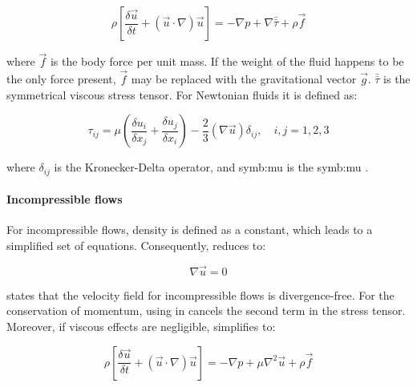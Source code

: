 \begin{equation}
\rho\left[\frac{\delta \vec{u}}{\delta t}+(\vec{u}\cdot\nabla)\vec{u} \right ]=-\nabla p + \nabla \bar{\bar{\tau}}+\rho \vec{f}
\label{eq:theory:momentum_conservation}
\end{equation}

where $\vec{f}$ is the body force per unit mass. If the weight of the fluid happens to be the only force present, $\vec{f}$ may be replaced with the gravitational vector $\vec{g}$.
$\bar{\bar{\tau}}$ is the symmetrical viscous stress tensor. For Newtonian fluids it is defined as:




\begin{equation}
\tau_{ij} = \mu \left(\frac{\delta u_i}{\delta x_j} +\frac{\delta u_j}{\delta x_i}\right )-\frac{2}{3} (\nabla \vec{u})\delta_{ij} ,\quad i,j = 1,2,3
\label{eq:CFD:stress_tensor}
\end{equation}


where $\delta_{ij}$ is the Kronecker-Delta operator, and \gls{symb:mu} is the \glsdesc{symb:mu} \citep{Sert2012}.

\paragraph*{Incompressible flows}


For incompressible flows, density is defined as a constant, which leads to a simplified set of equations. Consequently,   reduces to:


\begin{equation}
\nabla \vec{u} = 0
\label{eq:CFD:continuity_imcompressible}
\end{equation}

 states that the velocity field for incompressible flows is divergence-free. For the conservation of momentum, using  in    cancels the second term in the stress tensor. Moreover, if viscous effects are negligible,  simplifies to:



\begin{equation}
\rho\left[\frac{\delta \vec{u}}{\delta t}+(\vec{u}\cdot\nabla)\vec{u} \right ]=-\nabla p + \mu \nabla^2 \vec{u} +\rho \vec{f}
\label{eq:Navier_incompressible}
\end{equation}

